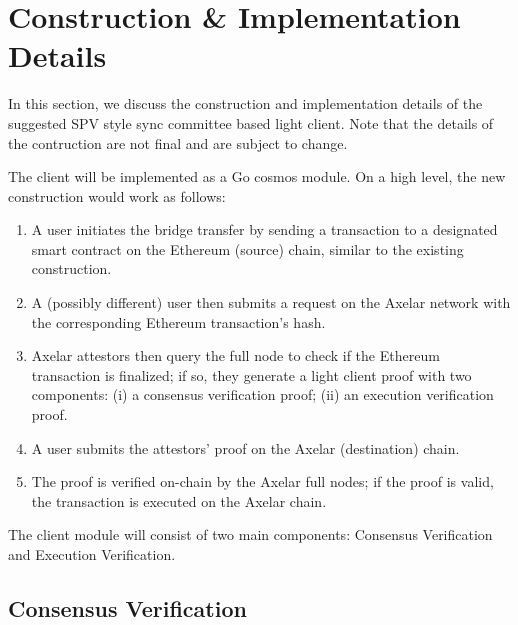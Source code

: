 \section{Construction \& Implementation Details}

In this section, we discuss the construction and implementation details 
of the suggested SPV style sync committee based light client. Note that the details of 
the contruction are not final and are subject to change.

The client will be implemented as a Go cosmos module. On a high level, the new
construction would work as follows:
\begin{enumerate}
    \item A user initiates the bridge transfer by sending a transaction to a
        designated smart contract on the Ethereum (source) chain, similar to
        the existing construction.
    \item A (possibly different) user then submits a request on the Axelar
        network with the corresponding Ethereum transaction's hash.
    \item Axelar attestors then query the full node to check if the Ethereum
        transaction is finalized; if so, they generate a light client proof with
        two components: (i) a consensus verification proof; (ii) an
        execution verification proof.
    \item A user submits the attestors' proof on the Axelar (destination)
        chain.
    \item The proof is verified on-chain by the Axelar full nodes; if the proof
        is valid, the transaction is executed on the Axelar chain.
\end{enumerate}

The client module will consist of two main components: Consensus Verification
and Execution Verification.

\subsection{Consensus Verification}

